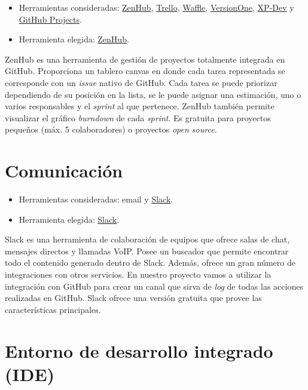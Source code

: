 \begin{itemize}
\tightlist
\item
  Herramientas consideradas: \href{https://www.zenhub.com/}{ZenHub},
  \href{https://trello.com/}{Trello}, \href{https://waffle.io/}{Waffle},
  \href{https://www.versionone.com/}{VersionOne},
  \href{https://xp-dev.com/}{XP-Dev} y \href{https://github.com/}{GitHub
  Projects}.
\item
  Herramienta elegida: \href{https://www.zenhub.com/}{ZenHub}.
\end{itemize}

ZenHub es una herramienta de gestión de proyectos totalmente integrada
en GitHub. Proporciona un tablero canvas en donde cada tarea
representada se corresponde con un \emph{issue} nativo de GitHub. Cada
tarea se puede priorizar dependiendo de su posición en la lista, se le
puede asignar una estimación, uno o varios responsables y el
\emph{sprint} al que pertenece. ZenHub también permite visualizar el
gráfico \emph{burndown} de cada \emph{sprint}. Es gratuita para
proyectos pequeños (máx. 5 colaboradores) o proyectos \emph{open
source}.

\section{Comunicación}\label{comunicacion}

\begin{itemize}
\tightlist
\item
  Herramientas consideradas: email y
  \href{https://gobees.slack.com/}{Slack}.
\item
  Herramienta elegida: \href{https://gobees.slack.com/}{Slack}.
\end{itemize}

Slack es una herramienta de colaboración de equipos que ofrece salas de
chat, mensajes directos y llamadas VoIP. Posee un buscador que permite
encontrar todo el contenido generado dentro de Slack. Además, ofrece un
gran número de integraciones con otros servicios. En nuestro proyecto
vamos a utilizar la integración con GitHub para crear un canal que sirva
de \emph{log} de todas las acciones realizadas en GitHub. Slack ofrece una
versión gratuita que provee las características principales.

\section{Entorno de desarrollo integrado
(IDE)}\label{entorno-de-desarrollo-integrado-ide}

